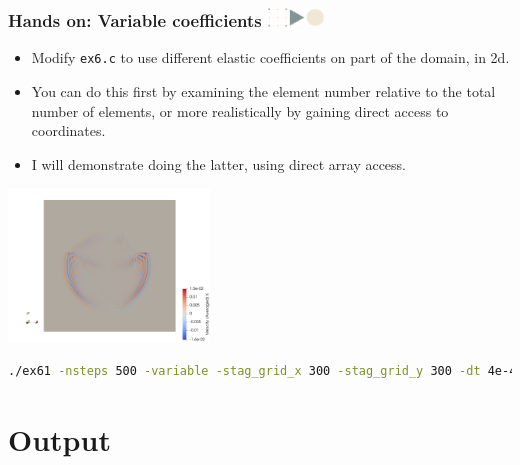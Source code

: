 \documentclass{beamer}
\newcommand\frametitlelogo[1]{\frametitle{#1\hspace{0pt plus 1 filll} \includegraphics[width=42pt]{logo_slides}}}
\begin{document}
\begin{frame}[fragile]
\frametitlelogo{Hands on: Variable coefficients}
\begin{itemize}
\item Modify \texttt{ex6.c} to use different elastic coefficients on part of the domain, in 2d.
\item You can do this first by examining the element number relative to the total number of elements,
  or more realistically by gaining direct access to coordinates.
\item I will demonstrate doing the latter, using direct array access.
\end{itemize}
\begin{center}
\includegraphics[width=0.4\textwidth]{500_var_x.png}
\end{center}
\begin{lstlisting}[language=bash,basicstyle=\scriptsize\ttfamily]
./ex61 -nsteps 500 -variable -stag_grid_x 300 -stag_grid_y 300 -dt 4e-4
\end{lstlisting}
\end{frame}

\section{Output}
\end{document}
